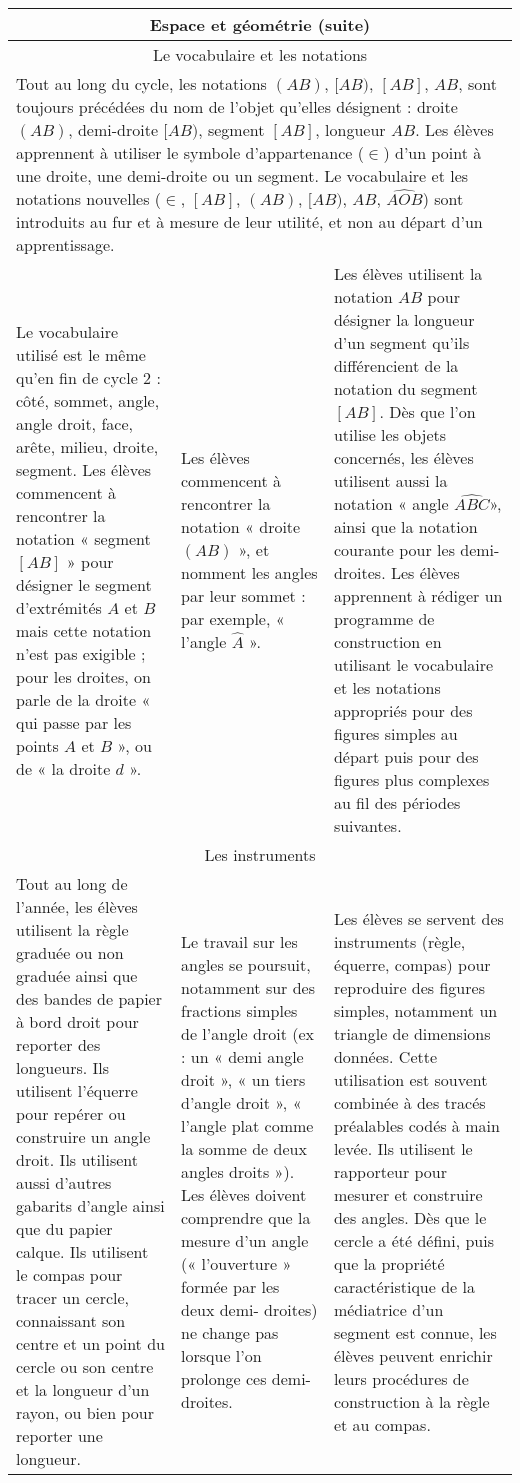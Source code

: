 \documentclass[11pt]{article}
\newcommand{\categorie}[1]{\hline\multicolumn{3}{|c|}{\color{white}\Large\cellcolor{or}\sffamily\phantom{É} #1 \phantom{É}}\rmfamily \\\hline}
\newcommand{\souscategorie}[1]{\hline\multicolumn{3}{|c|}{\color{or}\sffamily\phantom{É}#1\phantom{É}\rmfamily}\\\hline}
\newcommand{\note}[1]{\hline\multicolumn{3}{|p{18.6cm}|}{#1} \\ \hline}
\newenvironment{programme}
{
    \setlength{\arrayrulewidth}{0.5pt}
    \arrayrulecolor{or}
    \begin{center}
    \begin{tabular}{|p{6.4cm}|p{6.4cm}|p{6.4cm}|}
}
{
    \hline
    \end{tabular}
    \end{center}
}
\begin{document}
\begin{programme}
    \categorie{Espace et géométrie (suite)} 
    
    \souscategorie{Le vocabulaire et les notations} 
    \note{Tout au long du cycle, les notations $(AB)$, $[AB)$, $[AB]$, $AB$, sont toujours précédées du nom de l’objet qu’elles désignent : droite $(AB)$, demi-droite $[AB)$, segment $[AB]$, longueur $AB$. Les élèves apprennent à utiliser le symbole d’appartenance ($\in$) d’un point à une droite, une demi-droite ou un segment. Le vocabulaire et les notations nouvelles ($\in$, $[AB]$, $(AB)$, $[AB)$, $AB$, $\widehat{AOB}$) sont introduits au fur et à mesure de leur utilité, et non au départ d’un apprentissage.} 
    Le vocabulaire utilisé est le même qu’en fin de cycle 2 : côté, sommet, angle, angle droit, face, arête, milieu, droite, segment. Les élèves commencent à rencontrer la notation « segment $[AB]$ » pour désigner le segment d’extrémités $A$ et $B$ mais cette notation n’est pas exigible ; pour les droites, on parle de la droite « qui passe par les points $A$ et $B$ », ou de « la droite $d$ ». & Les élèves commencent à rencontrer la notation « droite $(AB)$ », et nomment les angles par leur sommet : par exemple, « l’angle $\hat{A}$ ». & Les élèves utilisent la notation $AB$ pour désigner la longueur d’un segment qu’ils différencient de la notation du segment $[AB]$. Dès que l’on utilise les objets concernés, les élèves utilisent aussi la notation « angle $\widehat{ABC}$», ainsi que la notation courante pour les demi-droites. Les élèves apprennent à rédiger un programme de construction en utilisant le vocabulaire et les notations appropriés pour des figures simples au départ puis pour des figures plus complexes au fil des périodes suivantes. \\
    \souscategorie{Les instruments} 
    Tout au long de l’année, les élèves utilisent la règle graduée ou non graduée ainsi que des bandes de papier à bord droit pour reporter des longueurs. Ils utilisent l’équerre pour repérer ou construire un angle droit. Ils utilisent aussi d’autres gabarits d’angle ainsi que du papier calque. Ils utilisent le compas pour tracer un cercle, connaissant son centre et un point du cercle ou son centre et la longueur d’un rayon, ou bien pour reporter une longueur. & Le travail sur les angles se poursuit, notamment sur des fractions simples de l’angle droit (ex : un « demi angle droit », « un tiers d’angle droit », « l’angle plat comme la somme de deux angles droits »). Les élèves doivent comprendre que la mesure d’un angle (« l’ouverture » formée par les deux demi- droites) ne change pas lorsque l’on prolonge ces demi-droites. & Les élèves se servent des instruments (règle, équerre, compas) pour reproduire des figures simples, notamment un triangle de dimensions données. Cette utilisation est souvent combinée à des tracés préalables codés à main levée. Ils utilisent le rapporteur pour mesurer et construire des angles. Dès que le cercle a été défini, puis que la propriété caractéristique de la médiatrice d’un segment est connue, les élèves peuvent enrichir leurs procédures de construction à la règle et au compas. \\

\end{programme}
\end{document}
